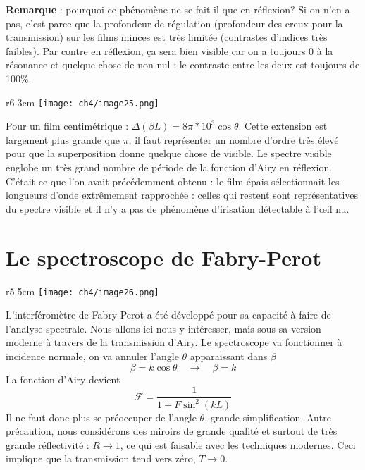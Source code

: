 \newpage
\textbf{Remarque} : pourquoi ce phénomène ne se fait-il que en réflexion? Si on n'en a pas, c'est 
parce que la profondeur de régulation (profondeur des creux pour la transmission) sur les films 
minces est très limitée (contrastes d'indices très faibles). Par contre en réflexion, ça sera 
bien visible car on a toujours 0 à la résonance et quelque chose de non-nul : le contraste entre 
les deux est toujours de 100\%.\\

	\begin{wrapfigure}[9]{r}{6.3cm}
	\vspace{-8mm}
	\texttt{[image: ch4/image25.png]}
	\end{wrapfigure}
Pour un film centimétrique : $\Delta(\beta L) = 8\pi*10^3\cos\theta$. Cette extension est largement 
plus grande que $\pi$, il faut représenter un nombre d'ordre très élevé pour que la superposition 
donne quelque chose de visible. Le spectre visible englobe un très grand nombre de période de la 
fonction d'Airy en réflexion. C'était ce que l'on avait précédemment obtenu : le film épais 
sélectionnait les longueurs d'onde extrêmement rapprochée : celles qui restent sont représentatives 
du spectre visible et il n'y a pas de phénomène d'irisation détectable à l’œil nu.


\newpage
\section{Le spectroscope de Fabry-Perot}
	\begin{wrapfigure}[13]{r}{5.5cm}
	\vspace{-8mm}
	\texttt{[image: ch4/image26.png]}
	\end{wrapfigure}
L'interféromètre de Fabry-Perot a été développé pour sa capacité à faire de l'analyse spectrale. 
Nous allons ici nous y intéresser, mais sous sa version moderne à travers de la transmission d'Airy. 
Le spectroscope va fonctionner à incidence normale, on va annuler l'angle $\theta$ apparaissant dans 
$\beta$
\begin{equation}
\beta = k\cos\theta \quad\rightarrow\quad \beta = k
\end{equation}
La fonction d'Airy devient
\begin{equation}
\mathcal{F} = \dfrac{1}{1+F\sin^2(kL)}
\end{equation}
Il ne faut donc plus se préoccuper de l'angle $\theta$, grande simplification. Autre précaution, 
nous considérons des miroirs de grande qualité et surtout de très grande réflectivité : $
R\rightarrow 1$, ce qui est faisable avec les techniques modernes. Ceci implique que la 
transmission tend vers zéro, $T\rightarrow0$.\\

